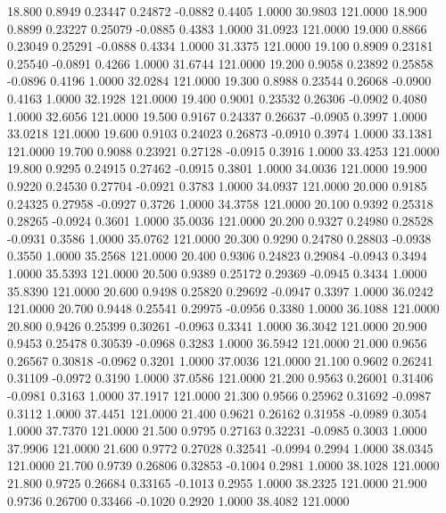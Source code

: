   18.800   0.8949   0.23447   0.24872  -0.0882   0.4405   1.0000  30.9803 121.0000
  18.900   0.8899   0.23227   0.25079  -0.0885   0.4383   1.0000  31.0923 121.0000
  19.000   0.8866   0.23049   0.25291  -0.0888   0.4334   1.0000  31.3375 121.0000
  19.100   0.8909   0.23181   0.25540  -0.0891   0.4266   1.0000  31.6744 121.0000
  19.200   0.9058   0.23892   0.25858  -0.0896   0.4196   1.0000  32.0284 121.0000
  19.300   0.8988   0.23544   0.26068  -0.0900   0.4163   1.0000  32.1928 121.0000
  19.400   0.9001   0.23532   0.26306  -0.0902   0.4080   1.0000  32.6056 121.0000
  19.500   0.9167   0.24337   0.26637  -0.0905   0.3997   1.0000  33.0218 121.0000
  19.600   0.9103   0.24023   0.26873  -0.0910   0.3974   1.0000  33.1381 121.0000
  19.700   0.9088   0.23921   0.27128  -0.0915   0.3916   1.0000  33.4253 121.0000
  19.800   0.9295   0.24915   0.27462  -0.0915   0.3801   1.0000  34.0036 121.0000
  19.900   0.9220   0.24530   0.27704  -0.0921   0.3783   1.0000  34.0937 121.0000
  20.000   0.9185   0.24325   0.27958  -0.0927   0.3726   1.0000  34.3758 121.0000
  20.100   0.9392   0.25318   0.28265  -0.0924   0.3601   1.0000  35.0036 121.0000
  20.200   0.9327   0.24980   0.28528  -0.0931   0.3586   1.0000  35.0762 121.0000
  20.300   0.9290   0.24780   0.28803  -0.0938   0.3550   1.0000  35.2568 121.0000
  20.400   0.9306   0.24823   0.29084  -0.0943   0.3494   1.0000  35.5393 121.0000
  20.500   0.9389   0.25172   0.29369  -0.0945   0.3434   1.0000  35.8390 121.0000
  20.600   0.9498   0.25820   0.29692  -0.0947   0.3397   1.0000  36.0242 121.0000
  20.700   0.9448   0.25541   0.29975  -0.0956   0.3380   1.0000  36.1088 121.0000
  20.800   0.9426   0.25399   0.30261  -0.0963   0.3341   1.0000  36.3042 121.0000
  20.900   0.9453   0.25478   0.30539  -0.0968   0.3283   1.0000  36.5942 121.0000
  21.000   0.9656   0.26567   0.30818  -0.0962   0.3201   1.0000  37.0036 121.0000
  21.100   0.9602   0.26241   0.31109  -0.0972   0.3190   1.0000  37.0586 121.0000
  21.200   0.9563   0.26001   0.31406  -0.0981   0.3163   1.0000  37.1917 121.0000
  21.300   0.9566   0.25962   0.31692  -0.0987   0.3112   1.0000  37.4451 121.0000
  21.400   0.9621   0.26162   0.31958  -0.0989   0.3054   1.0000  37.7370 121.0000
  21.500   0.9795   0.27163   0.32231  -0.0985   0.3003   1.0000  37.9906 121.0000
  21.600   0.9772   0.27028   0.32541  -0.0994   0.2994   1.0000  38.0345 121.0000
  21.700   0.9739   0.26806   0.32853  -0.1004   0.2981   1.0000  38.1028 121.0000
  21.800   0.9725   0.26684   0.33165  -0.1013   0.2955   1.0000  38.2325 121.0000
  21.900   0.9736   0.26700   0.33466  -0.1020   0.2920   1.0000  38.4082 121.0000

